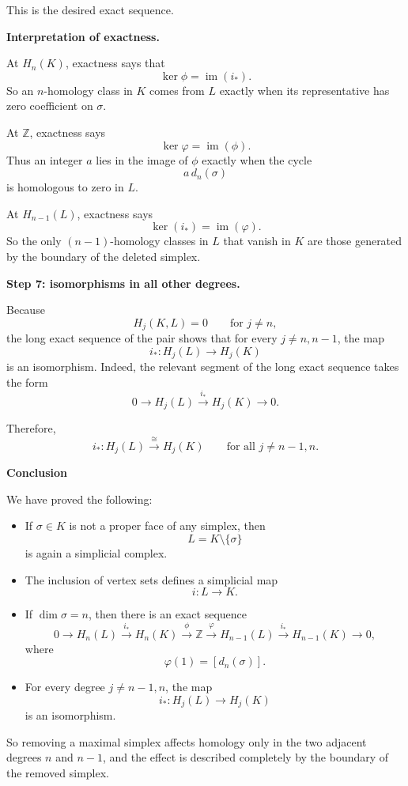 \begin{solution}
This is the desired exact sequence.

\par

\textbf{Interpretation of exactness.}

At \(H_n(K)\), exactness says that
\[
\ker \phi = \operatorname{im}(i_*).
\]
So an \(n\)-homology class in \(K\) comes from \(L\) exactly when its representative has zero coefficient on \(\sigma\).

At \(\mathbb Z\), exactness says
\[
\ker \varphi = \operatorname{im}(\phi).
\]
Thus an integer \(a\) lies in the image of \(\phi\) exactly when the cycle
\[
a\,d_n(\sigma)
\]
is homologous to zero in \(L\).

At \(H_{n-1}(L)\), exactness says
\[
\ker(i_*)=\operatorname{im}(\varphi).
\]
So the only \((n-1)\)-homology classes in \(L\) that vanish in \(K\) are those generated by the boundary of the deleted simplex.

\par

\textbf{Step 7: isomorphisms in all other degrees.}

Because
\[
H_j(K,L)=0\qquad \text{for } j\neq n,
\]
the long exact sequence of the pair shows that for every \(j\neq n,n-1\), the map
\[
i_*:H_j(L)\to H_j(K)
\]
is an isomorphism. Indeed, the relevant segment of the long exact sequence takes the form
\[
0\to H_j(L)\xrightarrow{i_*} H_j(K)\to 0.
\]

Therefore,
\[
i_*:H_j(L)\xrightarrow{\cong} H_j(K)
\qquad\text{for all } j\neq n-1,n.
\]


\medskip
\noindent\textbf{Conclusion}\par
\smallskip


We have proved the following:

\begin{itemize}
	\item If \(\sigma\in K\) is not a proper face of any simplex, then
	\[
	L=K\setminus\{\sigma\}
	\]
	is again a simplicial complex.

	\item The inclusion of vertex sets defines a simplicial map
	\[
	i:L\to K.
	\]

	\item If \(\dim \sigma=n\), then there is an exact sequence
	\[
	0\longrightarrow H_n(L)\xrightarrow{i_*} H_n(K)\xrightarrow{\phi} \mathbb Z
	\xrightarrow{\varphi} H_{n-1}(L)\xrightarrow{i_*} H_{n-1}(K)\longrightarrow 0,
	\]
	where
	\[
	\varphi(1)=[d_n(\sigma)].
	\]

	\item For every degree \(j\neq n-1,n\), the map
	\[
	i_*:H_j(L)\to H_j(K)
	\]
	is an isomorphism.
\end{itemize}

So removing a maximal simplex affects homology only in the two adjacent degrees \(n\) and \(n-1\), and the effect is described completely by the boundary of the removed simplex.
\end{solution}

